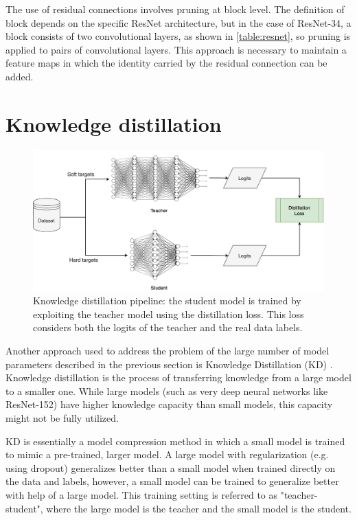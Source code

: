 The use of residual connections involves pruning at block level.
The definition of block depends on the specific ResNet architecture, but in the case of ResNet-34, a block consists of two convolutional layers, as shown in \autoref{table:resnet}, so pruning is applied to pairs of convolutional layers.
This approach is necessary to maintain a feature maps in which the identity carried by the residual connection can be added.

\section{Knowledge distillation}
\label{sec:method-kd}

\begin{figure}[H]%
	\centering

    \begin{center}
        \includegraphics[width=\columnwidth]{images/kd.drawio.png}
    \end{center}

	\caption{Knowledge distillation pipeline: the student model is trained by exploiting the teacher model using the distillation loss. This loss considers both the logits of the teacher and the real data labels.}%
	\label{fig:kd}%
\end{figure}

Another approach used to address the problem of the large number of model parameters described in the previous section is Knowledge Distillation (KD) \cite{hinton2015distilling}. Knowledge distillation is the process of transferring knowledge from a large model to a smaller one. While large models (such as very deep neural networks like ResNet-152) have higher knowledge capacity than small models, this capacity might not be fully utilized.

KD is essentially a model compression method in which a small model is trained to mimic a pre-trained, larger model.
A large model with regularization (e.g. using dropout) generalizes better than a small model when trained directly on the data and labels, however, a small model can be trained to generalize better with help of a large model. This training setting is referred to as "teacher-student", where the large model is the teacher and the small model is the student.

